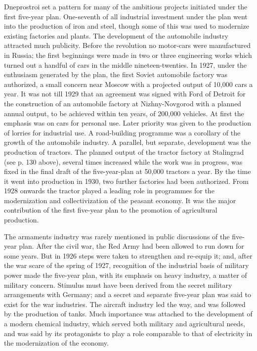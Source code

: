 Dneprostroi set a pattern for many of the ambitious projects initiated under the first five-year plan. One-seventh of all industrial investment under the plan went into the production of iron and steel, though some of this was used to modernize existing factories and plants. The development of the automobile industry attracted much publicity. Before the revolution no motor-cars were manufactured in Russia; the first beginnings were made in two or three engineering works which turned out a handful of cars in the middle nineteen-twenties. In 1927, under the enthusiasm generated by the plan, the first Soviet automobile factory was authorized, a small concern near Moscow with a projected output of 10,000 cars a year. It was not till 1929 that an agreement was signed with Ford of Detroit for the construction of an automobile factory at Nizhny-Novgorod with a planned annual output, to be achieved within ten years, of 200,000 vehicles. At first the emphasis was on cars for personal use. Later priority was given to the production of lorries for industrial use. A road-building programme was a corollary of the growth of the automobile industry. A parallel, but separate, development was the production of tractors. The planned output of the tractor factory at Stalingrad (see p. 130 above), several times increased while the work was in progress, was fixed in the final draft of the five-year-plan at 50,000 tractors a year. By the time it went into production in 1930, two further factories had been authorized. From 1928 onwards the tractor played a leading role in programmes for the modernization and collectivization of the peasant economy. It was the major contribution of the first five-year plan to the promotion of agricultural production. 

The armaments industry was rarely mentioned in public discussions of the five-year plan. After the civil war, the Red Army had been allowed to run down for some years. But in 1926 steps were taken to strengthen and re-equip it; and, after the war scare of the spring of 1927, recognition of the industrial basis of military power made the five-year plan, with its emphasis on heavy industry, a matter of military concern. Stimulus must have been derived from the secret military arrangements with Germany; and a secret and separate five-year plan was said to exist for the war industries. The aircraft industry led the way, and was followed by the production of tanks. Much importance was attached to the development of a modern chemical industry, which served both military and agricultural needs, and was said by its protagonists to play a role comparable to that of electricity in the modernization of the economy. 

